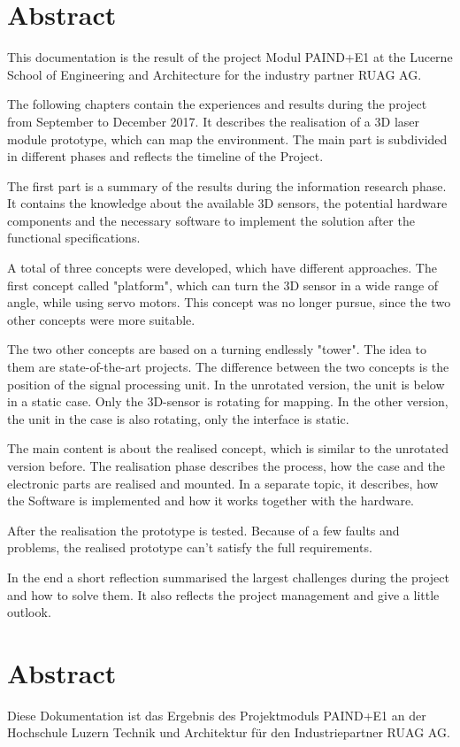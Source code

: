 \chapter*{Abstract}
\label{chap:Abstract}
This documentation is the result of the project Modul PAIND+E1 at the Lucerne School of Engineering and Architecture for the industry partner RUAG AG. 

The following chapters contain the experiences and results during the project from September to December 2017. It describes the realisation of a 3D laser module prototype, which can map the environment. The main part is subdivided in different phases and reflects the timeline of the Project. 

The first part is a summary of the results during the information research phase. It contains the knowledge about the available 3D sensors, the potential hardware components and the necessary software to implement the solution after the functional specifications. 

A total of three concepts were developed, which have different approaches. The first concept called "platform", which can turn the 3D sensor in a wide range of angle, while using servo motors. This concept was no longer pursue, since the two other concepts were more suitable.

The two other concepts are based on a turning endlessly "tower". The idea to them are state-of-the-art projects. The difference between the two concepts is the position of the signal processing unit. In the unrotated version, the unit is below in a static case. Only the 3D-sensor is rotating for mapping. In the other version, the unit in the case is also rotating, only the interface is static. 

The main content is about the realised concept, which is similar to the unrotated version before. The realisation phase describes the process, how the case and the electronic parts are realised and mounted. In a separate topic, it describes, how the Software is implemented and how it works together with the hardware. 

After the realisation the prototype is tested. Because of a few faults and problems, the realised prototype can't satisfy the full requirements. 

In the end a short reflection summarised the largest challenges during the project and how to solve them. It also reflects the project management and give a little outlook.


\chapter*{Abstract}
Diese Dokumentation ist das Ergebnis des Projektmoduls PAIND+E1 an der Hochschule Luzern Technik und Architektur für den Industriepartner RUAG AG.

